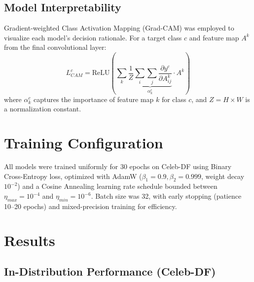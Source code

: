 \documentclass[runningheads]{llncs}
\begin{document}
\subsection{Model Interpretability}
Gradient-weighted Class Activation Mapping (Grad-CAM) was employed to visualize each model's decision rationale. For a target class $c$ and feature map $A^k$ from the final convolutional layer:
\begin{equation}
    L_{CAM}^c = \text{ReLU}\left(\sum_k \underbrace{\frac{1}{Z} \sum_i \sum_j \frac{\partial y^c}{\partial A_{ij}^k}}_{\alpha_k^c} \cdot A^k \right)
\end{equation}
where $\alpha_k^c$ captures the importance of feature map $k$ for class $c$, and $Z = H \times W$ is a normalization constant.

\section{Training Configuration}
All models were trained uniformly for 30 epochs on Celeb-DF using Binary Cross-Entropy loss, optimized with AdamW ($\beta_1{=}0.9, \beta_2{=}0.999$, weight decay $10^{-2}$) and a Cosine Annealing learning rate schedule bounded between $\eta_{max}{=}10^{-4}$ and $\eta_{min}{=}10^{-6}$. Batch size was 32, with early stopping (patience 10--20 epochs) and mixed-precision training for efficiency.

\section{Results}

\subsection{In-Distribution Performance (Celeb-DF)}
\end{document}
